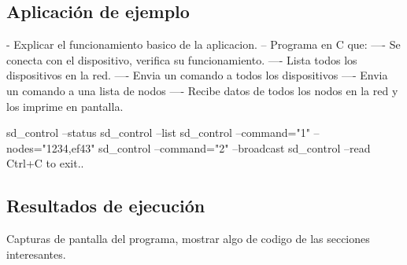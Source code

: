 \subsection{Aplicaci\'on de ejemplo}

- Explicar el funcionamiento basico de la aplicacion. 
-- Programa en C que: 
---- Se conecta con el dispositivo, verifica su funcionamiento.
---- Lista todos los dispositivos en la red. 
---- Envia un comando a todos los dispositivos
---- Envia un comando a una lista de nodos
---- Recibe datos de todos los nodos en la red y los imprime en pantalla. 

sd\_control --status 
sd\_control --list
sd\_control --command="1" --nodes="1234,ef43"
sd\_control --command="2" --broadcast
sd\_control --read
Ctrl+C to exit..

\subsection{Resultados de ejecuci\'on}

Capturas de pantalla del programa, mostrar algo de codigo de las secciones interesantes. 